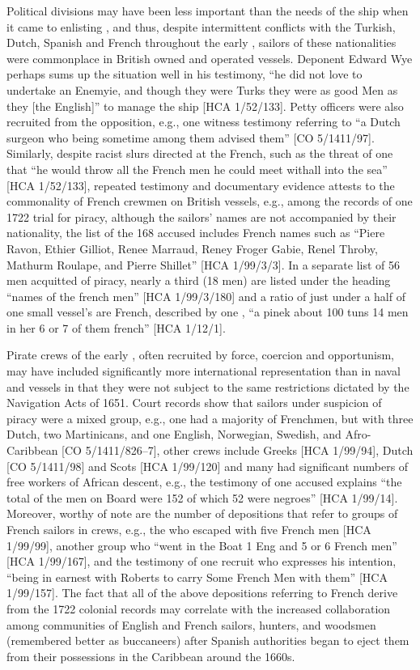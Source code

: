 Political divisions may have been less important than the needs of the ship when it came to enlisting , and thus, despite intermittent conflicts with the Turkish, Dutch, Spanish and French throughout the early , sailors of these nationalities were commonplace in British owned and operated vessels. Deponent Edward Wye perhaps sums up the situation well in his testimony, “he did not love to undertake an Enemyie, and though they were Turks they were as good Men as they [the English]” to manage the ship [HCA 1/52/133]. Petty officers were also recruited from the opposition, e.g., one witness testimony referring to “a Dutch surgeon who being sometime among them advised them” [CO 5/1411/97]. Similarly, despite racist slurs directed at the French, such as the threat of one  that “he would throw all the French men he could meet withall into the sea” [HCA 1/52/133], repeated testimony and documentary evidence attests to the commonality of French crewmen on British vessels, e.g., among the records of one 1722 trial for piracy, although the sailors’ names are not accompanied by their nationality, the list of the 168 accused includes French names such as “Piere Ravon, Ethier Gilliot, Renee Marraud, Reney Froger Gabie, Renel Throby, Mathurm Roulape, and Pierre Shillet” [HCA 1/99/3/3]. In a separate list of 56 men acquitted of piracy, nearly a third (18 men) are listed under the heading “names of the french men” [HCA 1/99/3/180] and a ratio of just under a half of one small vessel’s  are French, described by one , “a pinek about 100 tuns 14 men in her 6 or 7 of them french” [HCA 1/12/1]. 

Pirate crews of the early , often recruited by force, coercion and opportunism, may have included significantly more international representation than in naval and  vessels in that they were not subject to the same restrictions dictated by the Navigation Acts of 1651. Court records show that sailors under suspicion of piracy were a mixed group, e.g., one  had a majority of Frenchmen, but with three Dutch, two Martinicans, and one English, Norwegian, Swedish, and Afro-Caribbean  [CO 5/1411/826–7], other crews include Greeks [HCA 1/99/94], Dutch  [CO 5/1411/98] and Scots [HCA 1/99/120] and many had significant numbers of free workers of African descent, e.g., the testimony of one accused  explains “the total of the men on Board were 152 of which 52 were negroes” [HCA 1/99/14]. Moreover, worthy of note are the number of depositions that refer to groups of French sailors in  crews, e.g., the  who escaped with five French men [HCA 1/99/99], another group who “went in the Boat 1 Eng and 5 or 6 French men” [HCA 1/99/167], and the testimony of one recruit who expresses his intention, “being in earnest with Roberts to carry Some French Men with them” [HCA 1/99/157]. The fact that all of the above depositions referring to French  derive from the 1722 colonial records may correlate with the increased collaboration among communities of English and French sailors, hunters, and woodsmen (remembered better as buccaneers) after Spanish authorities began to eject them from their possessions in the Caribbean around the 1660s.


